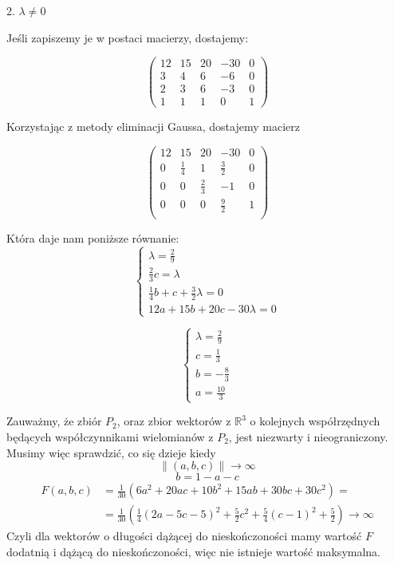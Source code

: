 \documentclass{article}[13pt]
\newcommand{\R}{\mathds{R}}
\begin{document}
    {\color{def}2. $\lambda\neq0$}
    \medskip

    Jeśli zapiszemy je w postaci macierzy, dostajemy:
    
    $$
        \begin{pmatrix}
            12 &15& 20& -30& 0\\
            3 & 4& 6& -6& 0\\
            2 &3& 6& -3& 0\\
            1& 1& 1& 0& 1
        \end{pmatrix}
    $$

    Korzystając z metody eliminacji Gaussa, dostajemy macierz

    $$
        \begin{pmatrix}
            12 & 15	& 20&	-30&	0\\
            0&	\frac14	&  1&	\frac32&	0\\
            0	&  0	&\frac23	 &-1&	0\\
            0	&  0	&  0&	\frac92	&1\\
        \end{pmatrix}
    $$

    Która daje nam poniższe równanie:
    $$
        \begin{cases}
            \lambda=\frac29\\
            \frac23c=\lambda\\
            \frac14b+c+\frac32\lambda=0\\
            12a+15b+20c-30\lambda=0
        \end{cases}
    $$

    $$
        \begin{cases}
            \lambda=\frac29\\
            c=\frac13\\
            b=-\frac83\\
            a=\frac{10}3
        \end{cases}
    $$

    Zauważmy, że zbiór $P_2$, oraz zbior wektorów z $\R^3$ o kolejnych współrzędnych będących współczynnikami wielomianów z $P_2$, jest niezwarty i nieograniczony. Musimy więc sprawdzić, co się dzieje kiedy
    $$\|(a,b,c)\|\to\infty$$
    $$b=1-a-c$$
    \begin{align*}
        F(a,b,c)&=\frac1{30}(6a^2+20ac+10b^2+15ab+30bc+30c^2)=\\
                &=\frac1{30}(\frac14(2a-5c-5)^2+\frac52c^2+\frac54(c-1)^2+\frac52)\to\infty
    \end{align*}
    Czyli dla wektorów o długości dążącej do nieskończoności mamy wartość $F$ dodatnią i dążącą do nieskończoności, więc nie istnieje wartość maksymalna.
\end{document}
